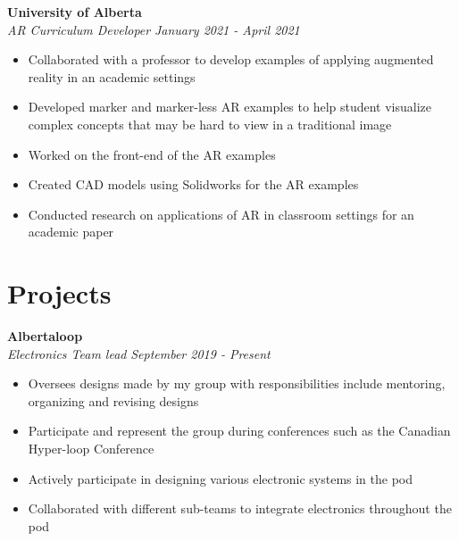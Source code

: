 \documentclass[a4paper,20pt]{article}
\begin{document}
    \vspace{-1pt}
        \textbf{University of Alberta}\hspace{11.5 cm}
        \textit{}\\
        \textit{AR Curriculum Developer}\hspace{10 cm}
        \textit{January 2021 - April 2021} \\
        \vspace{-8pt}
    \begin{itemize}
        \item Collaborated with a professor to develop examples of applying augmented reality in an academic settings \vspace{-5pt}
        \item Developed marker and marker-less AR examples to help student visualize complex concepts that may be hard to view in a traditional image \vspace{-5pt}
        \item Worked on the front-end of the AR examples \vspace{-5pt}
        \item Created CAD models using Solidworks for the AR examples  \vspace{-5pt}
        \item Conducted research on applications of AR in classroom settings for an academic paper
    \end{itemize}        

\vspace{-8pt}
\section{Projects}
    \vspace{-1pt}
        \textbf{Albertaloop} \hspace{12cm}
        \vspace{2pt}
        \textit{}\\
        \textit{Electronics Team lead} \hspace{10.4cm}
        \textit{September 2019 - Present}
        \vspace{-6pt}
    \begin{itemize}
        \item Oversees designs made by my group with responsibilities include mentoring, organizing and revising designs \vspace{-5pt}
        \item Participate and represent the group during conferences such as the Canadian Hyper-loop Conference  \vspace{-5pt}
        \item Actively participate in designing various electronic systems in the pod \vspace{-5pt}
        \item Collaborated with different sub-teams to integrate electronics throughout the pod
    \end{itemize}
\end{document}
